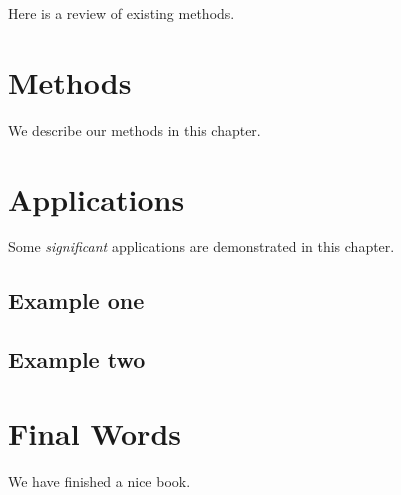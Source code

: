\documentclass[]{book}
\begin{document}
Here is a review of existing methods.

\hypertarget{methods}{%
\chapter{Methods}\label{methods}}

We describe our methods in this chapter.

\hypertarget{applications}{%
\chapter{Applications}\label{applications}}

Some \emph{significant} applications are demonstrated in this chapter.

\hypertarget{example-one}{%
\section{Example one}\label{example-one}}

\hypertarget{example-two}{%
\section{Example two}\label{example-two}}

\hypertarget{final-words}{%
\chapter{Final Words}\label{final-words}}

We have finished a nice book.


\end{document}
